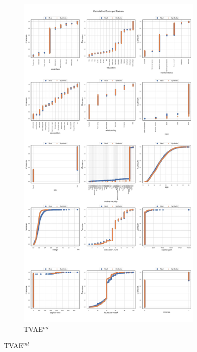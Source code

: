 \newpage
\begin{landscape}
	\begin{figure}[h]
		\centering
		\hfill
		\begin{subfigure}{0.3\linewidth}
			\includegraphics[height=\textheight,width=\linewidth,keepaspectratio]{images/cumsums/tvae.jpg}
			\caption{TVAE$^{ml}$}
		\end{subfigure}		

\end{figure}
\end{landscape}
